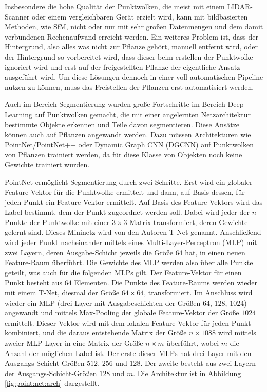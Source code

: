 \documentclass[12pt,titlepage, twoside]{article}
\begin{document}
Insbesondere die hohe Qualität der Punktwolken, die meist mit einem LIDAR-Scanner oder einem vergleichbaren Gerät erzielt wird, 
kann mit bildbasierten Methoden, wie SfM, nicht oder nur mit sehr großen Datenmengen und dem damit verbundenen Rechenaufwand erreicht werden. 
Ein weiteres Problem ist, dass der Hintergrund, also alles was nicht zur Pflanze gehört, manuell entfernt wird, 
oder der Hintergrund so vorbereitet wird, dass dieser beim erstellen der Punktwolke ignoriert wird und erst auf der freigestellten Pflanze der eigentliche Ansatz ausgeführt wird. 
Um diese Lösungen dennoch in einer voll automatischen Pipeline nutzen zu können, muss das Freistellen der Pflanzen erst automatisiert werden.

Auch im Bereich Segmentierung wurden große Fortschritte im Bereich Deep-Learning auf Punktwolken gemacht, die mit einer angelernten Netzarchitektur bestimmte Objekte erkennen und Teile davon segmentieren. 
Diese Ansätze können auch auf Pflanzen angewandt werden. Dazu müssen Architekturen wie PointNet\cite{qi2017pointnet}/PointNet++\cite{qi2017pointnet++} oder Dynamic Graph CNN (DGCNN) \cite{dgcnn} auf Punktwolken von Pflanzen trainiert werden, 
da für diese Klasse von Objekten noch keine Gewichte trainiert wurden.

PointNet ermöglicht Segmentierung durch zwei Schritte. Erst wird ein globaler Feature-Vektor für die Punktwolke ermittelt und dann, auf Basis dessen, für jeden Punkt ein Feature-Vektor ermittelt.
Auf Basis des Feature-Vektors wird das Label bestimmt, dem der Punkt zugeordnet werden soll. 
Dabei wird jeder der $n$ Punkte der Punktwolke mit einer $3\times 3$ Matrix transformiert, deren Gewichte gelernt sind. Dieses Mininetz wird von den Autoren T-Net genannt.
Anschließend wird jeder Punkt nacheinander mittels eines Multi-Layer-Perceptron (MLP) mit zwei Layern, deren Ausgabe-Schicht jeweils die Größe $64$ hat, in einen neuen Feature-Raum überführt. 
Die Gewichte des MLP werden also über alle Punkte geteilt, was auch für die folgenden MLPs gilt. Der Feature-Vektor für einen Punkt besteht aus $64$ Elementen.
Die Punkte des Feature-Raums werden wieder mit einem T-Net, diesmal der Größe $64\times 64$, transformiert. 
Im Anschluss wird wieder ein MLP (drei Layer mit Ausgabeschichten der Größen $64$, $128$, $1024$) angewandt und mittels Max-Pooling der globale Feature-Vektor der Größe $1024$ ermittelt. 
Dieser Vektor wird mit dem lokalen Feature-Vektor für jeden Punkt kombiniert, und die daraus entstehende Matrix der Größe $n\times 1088$ wird mittels zweier MLP-Layer in eine Matrix der Größe $n\times m$ überführt, wobei $m$ die Anzahl der möglichen Label ist.
Der erste dieser MLPs hat drei Layer mit den Ausgangs-Schicht-Größen $512$, $256$ und $128$. Der zweite besteht aus zwei Layern der Ausgangs-Schicht-Größen $128$ und $m$.
Die Architektur ist in Abbildung \ref{fig:point:net:arch} dargestellt.
\end{document}
